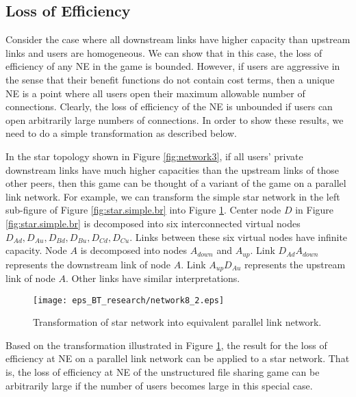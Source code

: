 \documentclass[conference]{IEEEtran}
\begin{document}

\subsection{Loss of Efficiency}

Consider the case where all downstream links have higher capacity
than upstream links and users are homogeneous. We can show that in
this case, the loss of efficiency of any NE in the game is
bounded. However, if users are aggressive in the sense that their
benefit functions do not contain cost terms, then a unique NE is a
point where all users open their maximum allowable number of
connections. Clearly, the loss of efficiency of the NE is
unbounded if users can open arbitrarily large numbers of
connections. In order to show these results, we need to do a
simple transformation as described below.


In the star topology shown in Figure \ref{fig:network3}, if all
users' private downstream links have much higher capacities than
the upstream links of those other peers, then this game can be
thought of a variant of the game on a parallel link network. For
example, we can transform the simple star network in the left
sub-figure of Figure \ref{fig:star.simple.br} into Figure
\ref{fig:network8_2}. Center node $D$ in Figure
\ref{fig:star.simple.br} is decomposed into six interconnected
virtual nodes $D_{Ad},D_{Au},D_{Bd},D_{Bu},D_{Cd},D_{Cu}$. Links
between these six virtual nodes have infinite capacity. Node $A$
is decomposed into nodes $A_{down}$ and $A_{up}$. Link
$D_{Ad}A_{down}$ represents the downstream link of node $A$. Link
$A_{up}D_{Au}$ represents the upstream link of node $A$. Other
links have similar interpretations.


\begin{figure}[htb!]
    \begin{center}
    \texttt{[image: eps\_BT\_research/network8\_2.eps]}
       \caption{Transformation of star network into equivalent parallel link network.}
\label{fig:network8_2}
    \end{center}
\end{figure}


Based on the transformation illustrated in Figure
\ref{fig:network8_2}, the result for the loss of efficiency at NE
on a parallel link network can be applied to a star network. That
is, the loss of efficiency at NE of the unstructured file sharing
game can be arbitrarily large if the number of users becomes large
in this special case.
\end{document}
